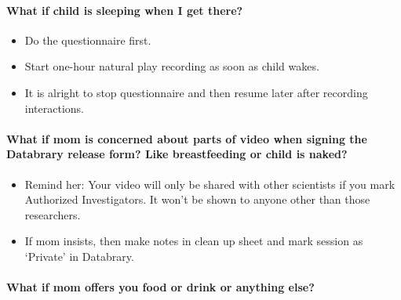 \documentclass[
  12pt,
]{book}
\providecommand{\tightlist}{%
  \setlength{\itemsep}{0pt}\setlength{\parskip}{0pt}}
\begin{document}
\hypertarget{what-if-child-is-sleeping-when-i-get-there}{%
\paragraph*{What if child is sleeping when I get there?}\label{what-if-child-is-sleeping-when-i-get-there}}

\begin{itemize}
\tightlist
\item
  Do the questionnaire first.
\item
  Start one-hour natural play recording as soon as child wakes.
\item
  It is alright to stop questionnaire and then resume later after recording interactions.
\end{itemize}

\hypertarget{what-if-mom-is-concerned-about-parts-of-video-when-signing-the-databrary-release-form-like-breastfeeding-or-child-is-naked}{%
\paragraph*{What if mom is concerned about parts of video when signing the Databrary release form? Like breastfeeding or child is naked?}\label{what-if-mom-is-concerned-about-parts-of-video-when-signing-the-databrary-release-form-like-breastfeeding-or-child-is-naked}}

\begin{itemize}
\tightlist
\item
  Remind her: Your video will only be shared with other scientists if you mark Authorized Investigators. It won't be shown to anyone other than those researchers.
\item
  If mom insists, then make notes in clean up sheet and mark session as `Private' in Databrary.
\end{itemize}

\hypertarget{what-if-mom-offers-you-food-or-drink-or-anything-else}{%
\paragraph*{What if mom offers you food or drink or anything else?}\label{what-if-mom-offers-you-food-or-drink-or-anything-else}}
\end{document}

